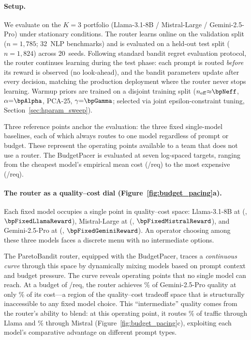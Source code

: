 \paragraph{Setup.}
We evaluate on the $K{=}3$ portfolio
(Llama-3.1-8B / Mistral-Large / Gemini-2.5-Pro)
under stationary conditions.
The router learns online on the validation split
($n{=}1{,}785$; 32~NLP benchmarks) and is evaluated on a held-out
test split ($n{=}1{,}824$) across 20~seeds.
Following standard bandit regret evaluation protocol, the router
continues learning during the test phase: each prompt is routed
\emph{before} its reward is observed (no look-ahead), and the
bandit parameters update after every decision, matching
the production deployment where the router never stops learning.
Warmup priors are trained on a disjoint training split
($n_{\mathrm{eff}}{\approx}\bpNeff$, $\alpha{=}\bpAlpha$, PCA-25,
$\gamma{=}\bpGamma$; selected via joint epsilon-constraint tuning,
Section~\ref{sec:hparam_sweep}).

Three reference points anchor the evaluation:
the three fixed single-model baselines, each of which always routes
to one model regardless of prompt or budget.
These represent the operating points available to a team that does
not use a router.
The BudgetPacer is evaluated at seven log-spaced targets, ranging
from the cheapest model's empirical mean cost
(\bpCheapestModelCost/req) to the most expensive
(\bpExpensiveModelCost/req).

\paragraph{The router as a quality--cost dial
(Figure~\ref{fig:budget_pacing}a).}
Each fixed model occupies a single point in quality--cost space:
Llama-3.1-8B at (\bpFixedLlamaCost, $\bpFixedLlamaReward$),
Mistral-Large at (\bpFixedMistralCost, $\bpFixedMistralReward$),
and Gemini-2.5-Pro at (\bpFixedGeminiCost, $\bpFixedGeminiReward$).
An operator choosing among these three models faces a discrete
menu with no intermediate options.

The ParetoBandit router, equipped with the BudgetPacer, traces a
\emph{continuous curve} through this space by dynamically mixing
models based on prompt context and budget pressure.
The curve reveals operating points that no single model can reach.
At a budget of \bpAnnotBudget/req, the router achieves
\bpAnnotQualPct\% of Gemini-2.5-Pro quality at only
\bpAnnotCostPct\% of its cost---a region of the quality--cost
tradeoff space that is structurally inaccessible to any fixed
model choice.
This ``intermediate'' quality comes from the router's ability to
blend: at this operating point, it routes \bpAnnotLlamaFrac\% of
traffic through Llama and \bpAnnotMistralFrac\% through Mistral
(Figure~\ref{fig:budget_pacing}c), exploiting each model's
comparative advantage on different prompt types.

